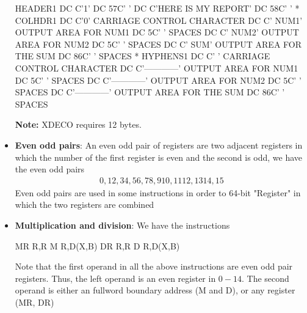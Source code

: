 \documentclass{report}
\begin{document}
\begin{itemize}
\begin{cppcode}
                        HEADER1  DC    C'1' 
                        DC    57C' ' 
                        DC    C'HERE IS MY REPORT' 
                        DC    58C' ' 
                        * 
                        COLHDR1  DC    C'0'              CARRIAGE CONTROL CHARACTER 
                        DC    C'        NUM1'   OUTPUT AREA FOR NUM1 
                        DC    5C' '             SPACES 
                        DC    C'        NUM2'   OUTPUT AREA FOR NUM2 
                        DC    5C' '             SPACES 
                        DC    C'         SUM'   OUTPUT AREA FOR THE SUM 
                        DC    86C' '            SPACES 
                        * 
                        HYPHENS1 DC    C' '              CARRIAGE CONTROL CHARACTER 
                        DC    C'------------'   OUTPUT AREA FOR NUM1 
                        DC    5C' '             SPACES 
                        DC    C'------------'   OUTPUT AREA FOR NUM2 
                        DC    5C' '             SPACES 
                        DC    C'------------'   OUTPUT AREA FOR THE SUM 
                        DC    86C' '            SPACES
                    \end{cppcode}
                    \bigbreak \noindent 
                    \textbf{Note:} XDECO requires 12 bytes.
                \item \textbf{Even odd pairs}: An even odd pair of registers are two adjacent registers in which the number of the first register is even and the second is odd, we have the even odd pairs
                    \begin{align*}
                        0,1
                        2,3
                        4,5
                        6,7
                        8,9
                        10,11
                        12,13
                        14,15
                    \end{align*}
                    Even odd pairs are used in some instructions in order to 64-bit "Register" in which the two registers are combined
                \item \textbf{Multiplication and division}: We have the instructions
                    \begin{cppcode}
                    MR  R,R
                    M   R,D(X,B)
                    DR  R,R
                    D   R,D(X,B)
                    \end{cppcode}
                    \bigbreak \noindent 
                    Note that the first operand in all the above instructions are even odd pair registers. Thus, the left operand is an even register in $0-14$. The second operand is either an fullword boundary address (M and D), or any register (MR, DR)

\end{itemize}
\end{document}
